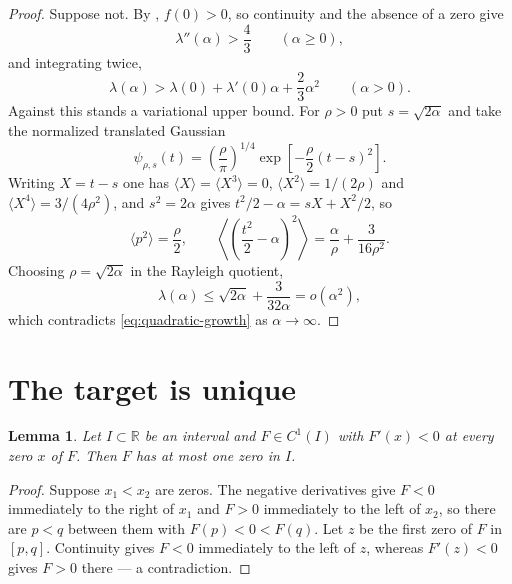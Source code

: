 \documentclass[11pt,reqno]{amsart}
\theoremstyle{plain}
\newtheorem{lemma}[theorem]{Lemma}
\theoremstyle{definition}
\theoremstyle{remark}
\numberwithin{equation}{section}
\begin{document}
\begin{proof}
  Suppose not. By , $f(0)>0$, so continuity and the
  absence of a zero give
  \begin{equation}
    \label{eq:no-zero}
    \lambda''(\alpha)>\frac43\qquad(\alpha\ge0),
  \end{equation}
  and integrating twice,
  \begin{equation}
    \label{eq:quadratic-growth}
    \lambda(\alpha)>\lambda(0)+\lambda'(0)\alpha+\frac23\alpha^2
    \qquad(\alpha>0).
  \end{equation}
  Against this stands a variational upper bound. For $\rho>0$ put
  $s=\sqrt{2\alpha}$ and take the normalized translated Gaussian
  \begin{equation*}
    \psi_{\rho,s}(t)=\left(\frac\rho\pi\right)^{1/4}
      \exp\left[-\frac\rho2(t-s)^2\right].
  \end{equation*}
  Writing $X=t-s$ one has $\langle X\rangle=\langle X^3\rangle=0$,
  $\langle X^2\rangle=1/(2\rho)$ and $\langle X^4\rangle=3/(4\rho^2)$, and
  $s^2=2\alpha$ gives $t^2/2-\alpha=sX+X^2/2$, so
  \begin{equation}
    \label{eq:gauss-moments}
    \langle p^2\rangle=\frac\rho2,
    \qquad
    \left\langle\left(\frac{t^2}{2}-\alpha\right)^2\right\rangle
    =\frac\alpha\rho+\frac3{16\rho^2}.
  \end{equation}
  Choosing $\rho=\sqrt{2\alpha}$ in the Rayleigh quotient,
  \begin{equation}
    \label{eq:upper}
    \lambda(\alpha)\le\sqrt{2\alpha}+\frac3{32\alpha}=o(\alpha^2),
  \end{equation}
  which contradicts \eqref{eq:quadratic-growth} as $\alpha\to\infty$.
\end{proof}

\section{The target is unique}
\label{sec:uniqueness}

\begin{lemma}
  \label{lem:zero-topology}
  Let $I\subset\mathbb R$ be an interval and $F\in C^1(I)$ with $F'(x)<0$ at
  every zero $x$ of $F$. Then $F$ has at most one zero in $I$.
\end{lemma}

\begin{proof}
  Suppose $x_1<x_2$ are zeros. The negative derivatives give $F<0$
  immediately to the right of $x_1$ and $F>0$ immediately to the left of
  $x_2$, so there are $p<q$ between them with $F(p)<0<F(q)$. Let $z$ be the
  first zero of $F$ in $[p,q]$. Continuity gives $F<0$ immediately to the
  left of $z$, whereas $F'(z)<0$ gives $F>0$ there --- a contradiction.
\end{proof}
\end{document}
